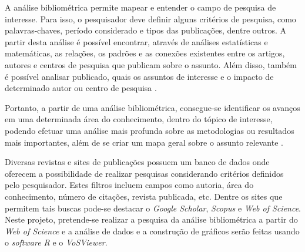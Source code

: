 \documentclass{article}[12pt]
\begin{document}
A análise bibliométrica permite mapear e entender o campo de pesquisa de interesse. Para isso, o
pesquisador deve definir alguns critérios de pesquisa, como palavras-chaves, período considerado e
tipos das publicações, dentre outros. A partir desta análise é possível
encontrar, através de análises estatísticas e matemáticas, as relações, os padrões e as conexões
existentes entre os artigos, autores e centros de pesquisa que publicam sobre o assunto. Além disso,
também é possível analisar
publicado, quais os assuntos de interesse e o impacto de determinado autor ou centro de pesquisa
\cite{Narin1994, Aksu2019}. \par


Portanto, a partir de uma análise bibliométrica, consegue-se identificar os avanços em uma
determinada área do conhecimento, dentro do tópico de interesse, podendo efetuar uma análise mais
profunda sobre as metodologias ou resultados mais importantes, além de se criar um mapa geral sobre
o assunto relevante \cite{Mongeon2016}. \par

Diversas revistas e sites de publicações possuem um banco de dados onde oferecem a possibilidade de
realizar pesquisas considerando critérios definidos pelo pesquisador. Estes filtros incluem campos
como  autoria, área do conhecimento, número de citações, revista publicada, etc. Dentre os sites que
permitem tais buscas pode-se destacar o \textit{Google Scholar}, \textit{Scopus} e \textit{Web of
Science}. Neste projeto, pretende-se realizar a pesquisa da análise bibliométrica a partir do
\textit{Web of Science} e a análise de dados e a construção de gráficos serão feitas usando o
\textit{software R} e o \textit{VoSViewer}.
\par
\end{document}
